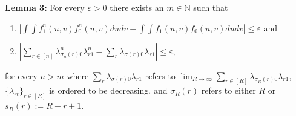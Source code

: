 \documentclass[12pt]{article}
\theoremstyle{definition}
\begin{document}
\begin{flushleft}
\textbf{Lemma 3:} For every $\varepsilon > 0$ there exists an $m \in \mathbb{N}$ such that  
\begin{enumerate}
\item[i.] $\left|\int\int f^{n}_{1}(u,v)f^{n}_{0}(u,v)dudv -  \int\int f_{1}(u,v)f_{0}(u,v)dudv\right| \leq \varepsilon$ and
\item[ii.] $\left|\sum_{r \in [n]}\lambda^{n}_{\sigma_{n}(r)0}\lambda^{n}_{r1} - \sum_{r}\lambda_{\sigma(r)0}\lambda_{r1}\right| \leq \varepsilon$, 
\end{enumerate}
for every $n > m$ where $\sum_{r}\lambda_{\sigma(r)0}\lambda_{r1}$ refers to $\lim_{R \to \infty}\sum_{r\in [R]}\lambda_{\sigma_{R}(r)0}\lambda_{r1}$, $\{\lambda_{rt}\}_{r \in [R]}$ is ordered to be decreasing, and $\sigma_{R}(r)$ refers to either $R$ or $s_{R}(r) := R-r+1$. %
\end{flushleft}
\end{document}
